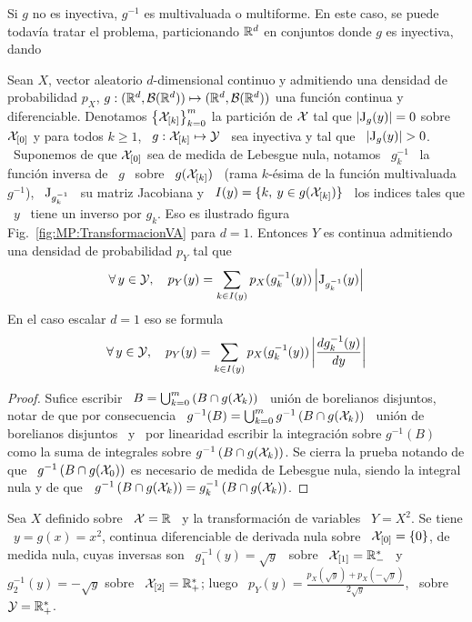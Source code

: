 Si $g$ no es inyectiva, $g^{-1}$  es multivaluada o multiforme. En este caso, se
puede todav\'ia  tratar el problema, particionando $\mathbb{R}^d$  en conjuntos donde
$g$ es inyectiva, dando
%
\begin{teorema}
  Sean $X$, vector aleatorio  $d$-dimensional continuo y admitiendo una densidad
  de  probabilidad   $p_X$,  $g:(\mathbb{R}^d  ,  \mathcal{B}(\mathbb{R}^d))   \mapsto  (\mathbb{R}^d  ,
  \mathcal{B}(\mathbb{R}^d))$  una  funci\'on continua  y  diferenciable.  Denotamos  $\left\{
    \mathcal{X}_{[k]} \right\}_{k=0}^m$ la partici\'on  de $\mathcal{X}$ tal que $\left| \operatorname{J}_g(y)
  \right| = 0$ sobre  $\mathcal{X}_{[0]}$ y para todos $k \ge 1$,  \ $g: \mathcal{X}_{[k]} \mapsto
  \mathcal{Y}$ \ sea inyectiva y tal que \ $\left| \operatorname{J}_g(y) \right| > 0$. \ Suponemos de
  que  $\mathcal{X}_{[0]}$ sea  de medida  de Lebesgue  nula, notamos  \ $g_k^{-1}$  \ la
  funci\'on inversa de  \ $g$ \ sobre \ $g(\mathcal{X}_{[k]})$ \  (rama $k$-\'esima de la
  funci\'on multivaluada $g^{-1}$), \  $\operatorname{J}_{g_k^{-1}}$ \ su matriz Jacobiana y
  \ $I(y) = \{ k, \: y \in g(\mathcal{X}_{[k]}) \}$ \ los indices tales que \ $y$ \ tiene
  un      inverso     por      $g_k$.      Eso      es      ilustrado     figura
  Fig.~\ref{fig:MP:TransformacionVA}  para $d  = 1$.   Entonces $Y$  es continua
  admitiendo una densidad de probabilidad $p_Y$ tal que
  \[
  \forall  \, y  \in \mathcal{Y},  \quad p_Y(y)  = \sum_{k  \in  I(y)} p_X(g_k^{-1}(y))
  \left| \operatorname{J}_{g_k^{-1}}(y) \right|
  \]
  En el caso escalar $d = 1$ eso se formula
  \[
  \forall \, y \in \mathcal{Y}, \quad  p_Y(y) = \sum_{k \in I(y)} p_X(g_k^{-1}(y)) \left|
    \frac{d g_k^{-1}(y)}{dy} \right|
  \]
\end{teorema}
%
\begin{proof}
  Sufice escribir  \ $B  = \bigcup_{k =  0}^m \left(  B \cap g(\mathcal{X}_k)  \right)$ \
  uni\'on de borelianos disjuntos, notar  de que por consecuencia \ $g^{-1}(B) =
  \bigcup_{k =0}^m g^{-1}\left( B \cap  g(\mathcal{X}_k) \right)$ \ uni\'on de borelianos
  disjuntos \  y \  por linearidad escribir  la integraci\'on  sobre $g^{-1}(B)$
  como la  suma de  integrales sobre $g^{-1}\left(  B \cap g(\mathcal{X}_k)  \right)$. Se
  cierra la  prueba notando de  que \ $g^{-1}\left(  B \cap g(\mathcal{X}_0)  \right)$ es
  necesario  de medida de  Lebesgue nula,  siendo la  integral nula  y de  que \
  $g^{-1}\left( B \cap g(\mathcal{X}_k) \right) = g_k^{-1}\left( B \cap g(\mathcal{X}_k) \right)$.
\end{proof}
%

\begin{ejemplo}
  Sea $X$ definido sobre  \ $\mathcal{X} = \mathbb{R}$ \ y la  transformaci\'on de variables \
  $Y = X^2$.   Se tiene \ $y  = g(x) = x^2$, continua  diferenciable de derivada
  nula  sobre \  $\mathcal{X}_{[0]} =  \{ 0  \}$, de  medida nula,  cuyas inversas  son \
  $g_1^{-1}(y) = \sqrt{y}$ \ sobre \ $\mathcal{X}_{[1]} = \mathbb{R}_-^*$ \ y \ $g_2^{-1}(y) =
  -   \sqrt{y}$  sobre   \   $\mathcal{X}_{[2]}   =  \mathbb{R}_+^*$;   luego   \  $p_Y(y)   =
  \frac{p_X(\sqrt{y})  +   p_X(-\sqrt{y})}{2  \sqrt{y}}$,   \  sobre  \   $\mathcal{Y}  =
  \mathbb{R}_+^*$.
\end{ejemplo}

